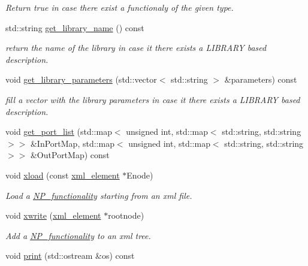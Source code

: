 \begin{DoxyCompactItemize}
\begin{DoxyCompactList}\small\item\em Return true in case there exist a functionaly of the given type. \end{DoxyCompactList}\item 
std\+::string \hyperlink{classNP__functionality_aa7c45178985092a5830506c425c42b63}{get\+\_\+library\+\_\+name} () const
\begin{DoxyCompactList}\small\item\em return the name of the library in case it there exists a L\+I\+B\+R\+A\+RY based description. \end{DoxyCompactList}\item 
void \hyperlink{classNP__functionality_ae6f15608e45bcf504170ceada6e36d72}{get\+\_\+library\+\_\+parameters} (std\+::vector$<$ std\+::string $>$ \&parameters) const
\begin{DoxyCompactList}\small\item\em fill a vector with the library parameters in case it there exists a L\+I\+B\+R\+A\+RY based description. \end{DoxyCompactList}\item 
void \hyperlink{classNP__functionality_a10fa42ec58e4687fa2b31e965dae3f29}{get\+\_\+port\+\_\+list} (std\+::map$<$ unsigned int, std\+::map$<$ std\+::string, std\+::string $>$$>$ \&In\+Port\+Map, std\+::map$<$ unsigned int, std\+::map$<$ std\+::string, std\+::string $>$$>$ \&Out\+Port\+Map) const
\item 
void \hyperlink{classNP__functionality_a735fea35a9e8c0fa66f447bd5040e84e}{xload} (const \hyperlink{classxml__element}{xml\+\_\+element} $\ast$Enode)
\begin{DoxyCompactList}\small\item\em Load a \hyperlink{classNP__functionality}{N\+P\+\_\+functionality} starting from an xml file. \end{DoxyCompactList}\item 
void \hyperlink{classNP__functionality_abef0c8beb48664e17a7089af4945d2a2}{xwrite} (\hyperlink{classxml__element}{xml\+\_\+element} $\ast$rootnode)
\begin{DoxyCompactList}\small\item\em Add a \hyperlink{classNP__functionality}{N\+P\+\_\+functionality} to an xml tree. \end{DoxyCompactList}\item 
void \hyperlink{classNP__functionality_a2e17b1f41fd29d5929aeb464ac87f233}{print} (std\+::ostream \&os) const

\end{DoxyCompactItemize}
